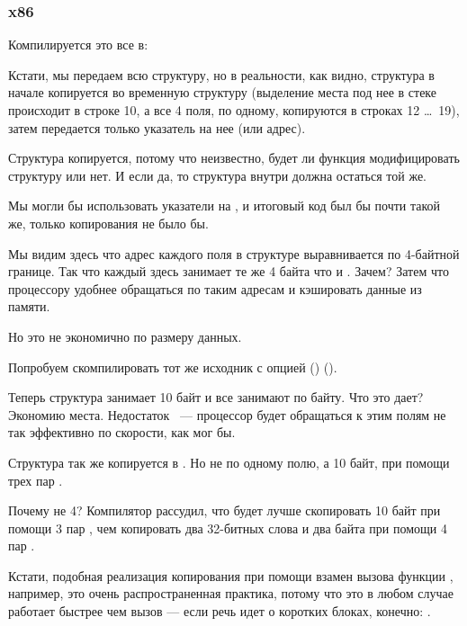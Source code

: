 ﻿\subsubsection{x86}

Компилируется это все в:



Кстати, мы передаем всю структуру, но в реальности, как видно, структура в начале копируется
во временную структуру (выделение места под нее в стеке происходит в строке 10,
а все 4 поля, по одному, копируются в строках 12 \ldots\ 19), 
затем передается только указатель на нее (или адрес).

Структура копируется, потому что неизвестно, будет ли функция \ttf модифицировать структуру или нет.
И если да, то структура внутри \main должна остаться той же.

Мы могли бы использовать указатели на \CCpp, и итоговый код был бы почти такой же,
только копирования не было бы.

Мы видим здесь что адрес каждого поля в структуре выравнивается по 4-байтной границе. 
Так что каждый \Tchar здесь занимает те же 4 байта что и \Tint. Зачем? 
Затем что процессору удобнее обращаться по таким адресам и кэшировать данные из памяти.

Но это не экономично по размеру данных.

Попробуем скомпилировать тот же исходник с опцией () 
().



Теперь структура занимает 10 байт и все \Tchar занимают по байту. Что это дает? 
Экономию места. Недостаток ~--- процессор будет обращаться к этим полям не так эффективно 
по скорости, как мог бы.

\label{short_struct_copying_using_MOV}
Структура так же копируется в \main. Но не по одному полю, а 10 байт, при помощи трех
пар \MOV.

Почему не 4?
Компилятор рассудил, что будет лучше скопировать 10 байт
при помощи 3 пар \MOV, чем копировать два 32-битных слова и два байта при помощи 4 пар \MOV.

Кстати, подобная реализация копирования при помощи \MOV взамен вызова функции , например, это
очень распространенная практика, потому что это в любом случае работает быстрее чем вызов  ---
если речь идет о коротких блоках, конечно: .

